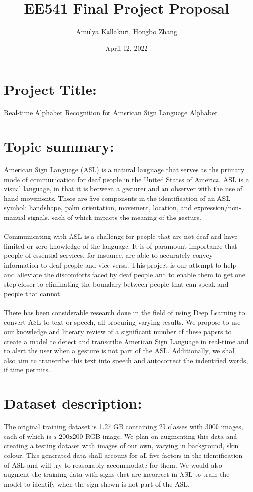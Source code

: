 \documentclass{article}
\title{EE541 Final Project Proposal}
\author{Amulya Kallakuri, Hongbo Zhang}
\date{April 12, 2022}
\begin{document}
\maketitle


\section{Project Title:} Real-time Alphabet Recognition for American Sign Language Alphabet

\section{Topic summary:} American Sign Language (ASL) is a natural language that serves as the primary mode of communication for deaf people in the United States of America. 
 ASL is a visual language, in that it is between a gesturer and an observer with the use of hand 
 movements. There are five components in the identification of an ASL symbol: handshape, palm 
 orientation, movement, location, and expression/non-manual signals, each of which impacts the meaning of the gesture. \\ \\ Communicating with ASL is a challenge for people that are not deaf 
 and have limited or zero knowledge of the language. It is of paramount importance that people 
 of essential services, for instance, are able to accurately convey information to deaf people and vice versa. 
 This project is our attempt to help and alleviate the discomforts faced by deaf people and to 
 enable them to get one step closer to eliminating the boundary between people that can speak and 
 people that cannot. \\ \\ There has been considerable research done in the field of using Deep Learning 
 to convert ASL to text or speech, all procuring varying results. We propose to use our knowledge 
 and literary review of a significant number of these papers to create a model to detect and 
 transcribe American Sign Language in real-time and to alert the user when a gesture is not part of the ASL. 
 Additionally, we shall also aim to transcribe this text into speech and autocorrect the indentified words, if time permits. 

\section{Dataset description:} The original training dataset is 1.27 GB 
containing 29 classes with 3000 images, each of which is a 200x200 RGB image. 
We plan on augmenting this data and creating a testing dataset with images of 
our own, varying in background, skin colour. This generated data shall account for all
five factors in the identification of ASL and will try to reasonably accommodate for them. We would also augment the training 
data with signs that are incorrect in ASL to train the model to identify when the 
sign shown is not part of the ASL.
\end{document}
